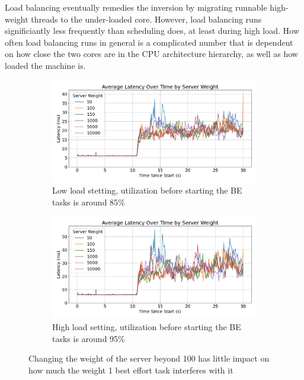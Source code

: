Load balancing eventually remedies the inversion by migrating runnable
high-weight threads to the under-loaded core. However, load balancing runs
significiantly less frequently than scheduling does, at least during high load.
How often load balancing runs in general is a complicated number that is
dependent on how close the two cores are in the CPU architecture hierarchy, as
well as how loaded the machine is.

\begin{figure}[t]
    \centering
    \begin{subfigure}{\columnwidth}
        \includegraphics[width=\columnwidth]{graphs/srv-bg-weight-cmp-low.png}
        \caption{Low load stetting, utilization before starting the BE tasks is
        around 85\%}\label{fig:srv-bg-weight-cmp-low}
        \vspace{12pt}
    \end{subfigure}
    \hspace{\fill}
    \begin{subfigure}{\columnwidth}
        \includegraphics[width=\columnwidth]{graphs/srv-bg-weight-cmp-high.png}
        \caption{High load setting, utilization before starting the BE tasks is
        around 95\%}\label{fig:srv-bg-weight-cmp-high}
    \end{subfigure}
    \vspace{4pt}
    \caption{Changing the weight of the server beyond 100 has little impact on
    how much the weight 1 best effort task interferes with it}\label{fig:srv-bg-weight-cmp}
\end{figure}

